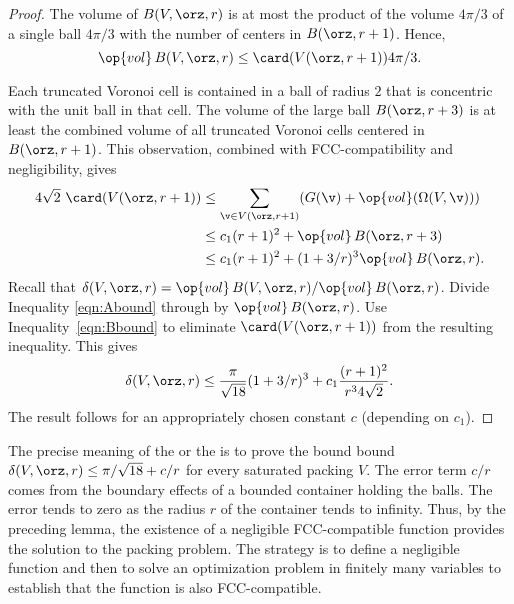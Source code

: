 \begin{proof} 
The volume of $B( V,\orz,r)$ is at most the product of the volume
$4\pi/3$ of a single ball $4\pi/3$ with the number of centers in
$B(\orz,r+1)$.  Hence,
\begin{equation} 
\op{vol}\, B( V,\orz,r) \le \card( V(\orz,r+1)) 4\pi/3.
\label{eqn:Abound}
\end{equation}

Each truncated Voronoi cell is contained in a ball of radius $2$ that
is concentric with the unit ball in that cell.  The volume of the
large ball $B(\orz,r+3)$ is at least the combined volume of all
truncated Voronoi cells centered in $B(\orz,r+1)$. This observation,
combined with FCC-compatibility and negligibility, gives
\begin{equation} 
\begin{split} 
4\sqrt{2}\,\,\card( V(\orz,r+1))
&\le \sum_{\v\in V(\orz,r+1)} (G(\v) +
\op{vol}(\Omega(V,\v))) \\
&\le c_1 (r+1)^2 + \op{vol}\,B(\orz,r+3) \\
&\le c_1 (r+1)^2 + (1+3/r)^3 \op{vol}\,B(\orz,r).
\label{eqn:Bbound}
\end{split}
\end{equation}
%
Recall that $\delta( V,\orz,r)=
\op{vol}\,B( V,\orz,r)/\op{vol}\,B(\orz,r)$. Divide Inequality
\ref{eqn:Abound} through by $\op{vol}\,B(\orz,r)$.  Use
Inequality~\ref{eqn:Bbound} to eliminate $\card( V(\orz,r+1))$ from the
resulting inequality.  This gives
\[ \delta( V,\orz,r)
\le \frac{\pi}{\sqrt{18}} (1+3/r)^3 + c_1 \frac{(r+1)^2}{r^34\sqrt{2}}.
\] 
The result follows for an appropriately chosen constant $c$
(depending on $c_1$).
\end{proof}

\begin{remark}
\label{remark:precise} 
The precise meaning of the  or the
 is to prove the bound bound $\delta(
V,\orz,r) \le \pi/\sqrt{18} + c/r$ for every saturated packing $ V$.
The error term $c/r$ comes from the boundary effects of a bounded
container holding the balls.  The error tends to zero as the radius
$r$ of the container tends to infinity.  Thus, by the preceding lemma,
the existence of a negligible FCC-compatible function provides the
solution to the packing problem.  The strategy is to define a
negligible function and then to solve an optimization problem in
finitely many variables to establish that the function is also
FCC-compatible.
\end{remark}






